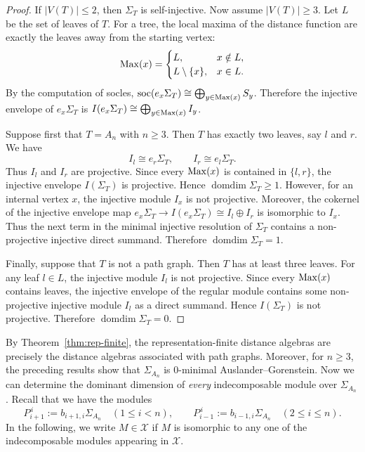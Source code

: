\documentclass[a4paper,leqno]{amsart}
\begin{document}
\begin{proof}
If $|V(T)|\leq 2$, then $\Sigma_T$ is self-injective. Now assume $|V(T)|\geq 3$. Let $L$ be the set of leaves of $T$. For a tree, the local maxima of the distance function are exactly the leaves away from the starting vertex:
$$\operatorname{Max}(x)=
\begin{cases}
L, & x\notin L,\\
L\setminus\{x\}, & x\in L.
\end{cases}$$
By the computation of socles,
$\operatorname{soc} (e_x\Sigma_T)\cong\bigoplus_{y\in \operatorname{Max}(x)}S_y$.
Therefore the injective envelope of $e_x\Sigma_T$ is $I(e_x\Sigma_T)\cong\bigoplus_{y\in \operatorname{Max}(x)}I_y$.

Suppose first that $T=A_n$ with $n\geq 3$. Then $T$ has exactly two leaves, say $l$ and $r$. We have
$$I_l\cong e_r\Sigma_T,\qquad I_r\cong e_l\Sigma_T.$$
Thus $I_l$ and $I_r$ are projective. Since every $\operatorname{Max}(x)$ is contained in $\{l,r\}$, the injective envelope $I(\Sigma_T)$ is projective. Hence $\operatorname{domdim}\Sigma_T\geq 1$. However, for an internal vertex $x$, the injective module $I_x$ is not projective. Moreover, the cokernel of the injective envelope map $e_x\Sigma_T\rightarrow I(e_x\Sigma_T)\cong I_l\oplus I_r$ is isomorphic to $I_x$. Thus the next term in the minimal injective resolution of $\Sigma_T$ contains a non-projective injective direct summand. Therefore $\operatorname{domdim}\Sigma_T=1$.

Finally, suppose that $T$ is not a path graph. Then $T$ has at least three leaves. For any leaf $l\in L$, the injective module $I_l$ is not projective. 
Since every $\operatorname{Max}(x)$ contains leaves, the injective envelope of the regular module contains some non-projective injective module $I_l$ as a direct summand. Hence $I(\Sigma_T)$ is not projective. Therefore $\operatorname{domdim}\Sigma_T=0$.
\end{proof}


By Theorem~\ref{thm:rep-finite}, the representation-finite distance algebras are precisely the distance algebras associated with path graphs. Moreover, for $n\geq3$, the preceding results show that $\Sigma_{A_n}$ is $0$-minimal Auslander--Gorenstein. 
Now we can determine the dominant dimension of \emph{every} indecomposable module over $\Sigma_{A_n}$. 
Recall that we have the modules
\[
P_{i+1}^{\,i}:=b_{i+1,i}\Sigma_{A_n}
\quad(1\leq i<n),
\qquad
P_{i-1}^{\,i}:=b_{i-1,i}\Sigma_{A_n}
\quad(2\leq i\leq n).
\]
In the following, we write $M\in \mathcal{X}$ if $M$ is isomorphic to any one of the indecomposable modules appearing in $\mathcal{X}$.
\end{document}
